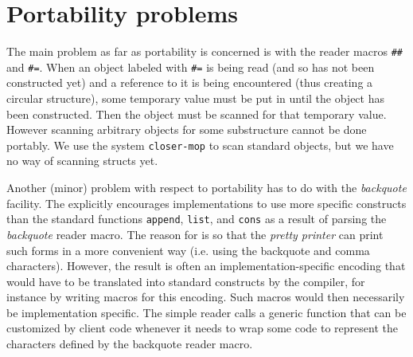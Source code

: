 \section{Portability problems}
\label{sec-reader-portability-problems}

The main problem as far as portability is concerned is with the reader
macros \texttt{\#\#} and \texttt{\#=}.  When an object labeled with
\texttt{\#=} is being read (and so has not been constructed yet) and a
reference to it is being encountered (thus creating a circular
structure), some temporary value must be put in until the object has
been constructed.  Then the object must be scanned for that temporary
value.  However scanning arbitrary objects for some substructure
cannot be done portably.  We use the system \texttt{closer-mop} to
scan standard objects, but we have no way of scanning structs yet.

Another (minor) problem with respect to portability has to do with the
\emph{backquote} facility.  The \hs{} explicitly encourages
implementations to use more specific constructs than the standard
\commonlisp{} functions \texttt{append}, \texttt{list}, and
\texttt{cons} as a result of parsing the \emph{backquote} reader
macro.  The reason for is so that the \emph{pretty printer} can print
such forms in a more convenient way (i.e. using the backquote and
comma characters).  However, the result is often an
implementation-specific encoding that would have to be translated into
standard \commonlisp{} constructs by the compiler, for instance by
writing macros for this encoding.  Such macros would then necessarily
be implementation specific.  The simple reader calls a generic
function that can be customized by client code whenever it needs to
wrap some code to represent the characters defined by the backquote
reader macro.
